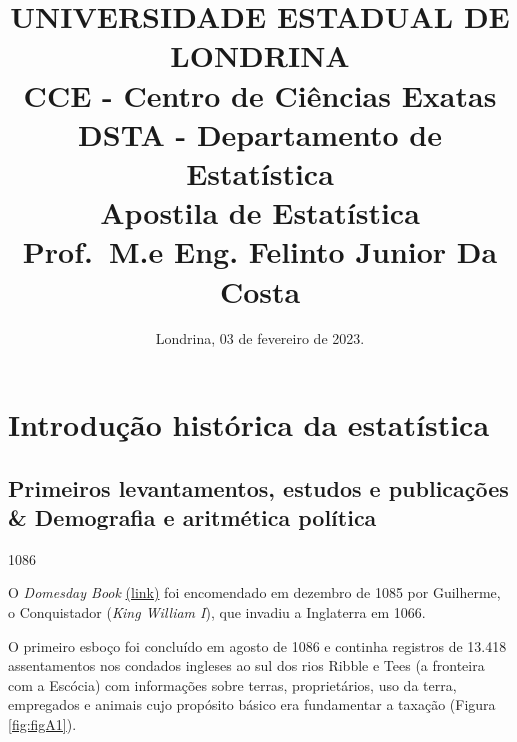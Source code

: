 \documentclass[
]{book}
\title{UNIVERSIDADE ESTADUAL DE LONDRINA\\
CCE - Centro de Ciências Exatas\\
DSTA - Departamento de Estatística\\
Apostila de Estatística\\
Prof.~M.e Eng. Felinto Junior Da Costa}
\author{}
\date{\vspace{-2.5em}Londrina, 03 de fevereiro de 2023.}
\begin{document}
\maketitle

{
\setcounter{tocdepth}{1}
\tableofcontents
}
\hypertarget{section}{%
\chapter*{}\label{section}}

\hypertarget{introduuxe7uxe3o-histuxf3rica-da-estatuxedstica}{%
\chapter{Introdução histórica da estatística}\label{introduuxe7uxe3o-histuxf3rica-da-estatuxedstica}}

\hypertarget{primeiros-levantamentos-estudos-e-publicauxe7uxf5es-demografia-e-aritmuxe9tica-poluxedtica}{%
\section{Primeiros levantamentos, estudos e publicações \& Demografia e aritmética política}\label{primeiros-levantamentos-estudos-e-publicauxe7uxf5es-demografia-e-aritmuxe9tica-poluxedtica}}

1086

\hfill\break

O \emph{Domesday Book} \href{http://www.nationalarchives.gov.uk/education/resources/domesday-book/}{(link)}
foi encomendado em dezembro de 1085 por Guilherme, o Conquistador (\emph{King William I}), que invadiu a Inglaterra em 1066.

O primeiro esboço foi concluído em agosto de 1086 e continha registros de 13.418 assentamentos nos condados ingleses ao sul dos rios Ribble e Tees (a fronteira com a Escócia) com informações sobre terras, proprietários, uso da terra, empregados e animais cujo propósito básico era fundamentar a taxação (Figura \ref{fig:figA1}).

\hfill\break
\end{document}
